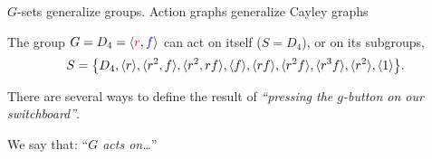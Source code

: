 \documentclass[8pt, handout]{beamer}
\newcommand{\Pause}{}      %
\begin{document}

\begin{frame}{$G$-sets generalize groups. Action graphs generalize Cayley graphs} 
  
  The group $G=D_4=\<{\color{xRed}r},{\color{xBlue}f}\>$ can act on
  itself ($S=D_4$), or on its subgroups,
  \[
  S=\big\{D_4,\langle r\rangle,\langle r^2,f\rangle,\langle r^2,rf\rangle,
  \langle f\rangle,\langle rf\rangle,\langle r^2f\rangle,\langle r^3f\rangle,\langle r^2\rangle,\langle1\rangle\big\}.
  \]

  \Pause
  
  There are several ways to define the result of
  \emph{``pressing the $g$-button on our switchboard''}. \medskip\Pause
  
  We say that: ``\emph{$G$ acts on\dots}''
  
  \vspace{-2mm}


\end{frame}
\end{document}
